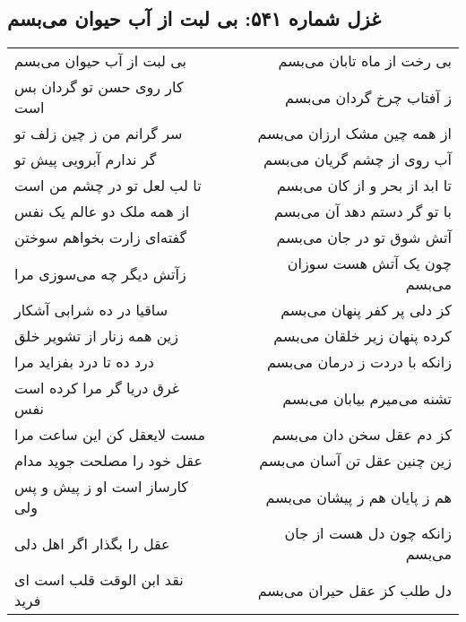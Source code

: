 \begin{center}
\section*{غزل شماره ۵۴۱: بی لبت از آب حیوان می‌بسم}
\label{sec:541}
\begin{longtable}{l p{0.5cm} r}
بی لبت از آب حیوان می‌بسم
&&
بی رخت از ماه تابان می‌بسم
\\
کار روی حسن تو گردان بس است
&&
ز آفتاب چرخ گردان می‌بسم
\\
سر گرانم من ز چین زلف تو
&&
از همه چین مشک ارزان می‌بسم
\\
گر ندارم آبرویی پیش تو
&&
آب روی از چشم گریان می‌بسم
\\
تا لب لعل تو در چشم من است
&&
تا ابد از بحر و از کان می‌بسم
\\
از همه ملک دو عالم یک نفس
&&
با تو گر دستم دهد آن می‌بسم
\\
گفته‌ای زارت بخواهم سوختن
&&
آتش شوق تو در جان می‌بسم
\\
زآتش دیگر چه می‌سوزی مرا
&&
چون یک آتش هست سوزان می‌بسم
\\
ساقیا در ده شرابی آشکار
&&
کز دلی پر کفر پنهان می‌بسم
\\
زین همه زنار از تشویر خلق
&&
کرده پنهان زیر خلقان می‌بسم
\\
درد ده تا درد بفزاید مرا
&&
زانکه با دردت ز درمان می‌بسم
\\
غرق دریا گر مرا کرده است نفس
&&
تشنه می‌میرم بیابان می‌بسم
\\
مست لایعقل کن این ساعت مرا
&&
کز دم عقل سخن دان می‌بسم
\\
عقل خود را مصلحت جوید مدام
&&
زین چنین عقل تن آسان می‌بسم
\\
کارساز است او ز پیش و پس ولی
&&
هم ز پایان هم ز پیشان می‌بسم
\\
عقل را بگذار اگر اهل دلی
&&
زانکه چون دل هست از جان می‌بسم
\\
نقد ابن الوقت قلب است ای فرید
&&
دل طلب کز عقل حیران می‌بسم
\\
\end{longtable}
\end{center}

